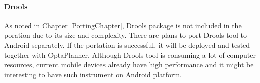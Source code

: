 \paragraph{Drools} %
As noted in Chapter \ref{PortingChapter}, Drools package is not included in the poration due to its size and
complexity. There are plans to port Drools tool to Android separately. If the portation is successful, it will be
deployed and tested together with OptaPlanner. Although Drools tool is consuming a lot of computer resources, current
mobile devices already have high performance and it might be interesting to have such instrument on Android platform.

